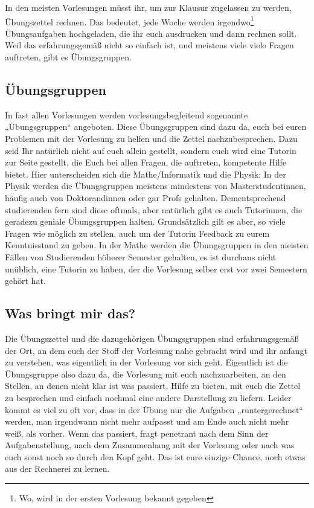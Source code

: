 \newpage{}

\noindent In den meisten Vorlesungen müsst ihr, um zur Klausur zugelassen zu werden, Übungszettel rechnen. Das bedeutet, jede Woche werden irgendwo\footnote{Wo, wird in der ersten Vorlesung bekannt gegeben} Übungsaufgaben hochgeladen, die ihr euch ausdrucken und dann rechnen sollt. Weil das erfahrungsgemäß nicht so einfach ist, und meistens viele viele Fragen auftreten, gibt es Übungsgruppen.

\subsection{Übungsgruppen}
In fast allen Vorlesungen werden vorlesungsbegleitend sogenannte „Übungsgruppen“ angeboten. Diese Übungsgruppen sind dazu da, euch bei euren Problemen mit der Vorlesung zu helfen und die Zettel nachzubesprechen. Dazu seid Ihr natürlich nicht auf euch allein gestellt, sondern euch wird eine Tutorin zur Seite gestellt, die Euch bei allen Fragen, die auftreten, kompetente Hilfe bietet. Hier unterscheiden sich die Mathe/Informatik und die Physik: In der Physik werden die Übungsgruppen meistens mindestens von Masterstudentinnen, häufig auch von Doktorandinnen oder gar Profs gehalten. Dementsprechend studierenden fern sind diese oftmals, aber natürlich gibt es auch Tutorinnen, die geradezu geniale Übungsgruppen halten. Grundsätzlich gilt es aber, so viele Fragen wie möglich zu stellen, auch um der Tutorin Feedback zu eurem Kenntnisstand zu geben. In der Mathe werden die Übungsgruppen in den meisten Fällen von Studierenden höherer Semester gehalten, es ist durchaus nicht unüblich, eine Tutorin zu haben, der die Vorlesung selber erst vor zwei Semestern gehört hat.

\subsection{Was bringt mir das?}
Die Übungszettel und die dazugehörigen Übungsgruppen sind erfahrungsgemäß der Ort, an dem euch der Stoff der Vorlesung nahe gebracht wird und ihr anfangt zu verstehen, was eigentlich in der Vorlesung vor sich geht. Eigentlich ist die Übungsgruppe also dazu da, die Vorlesung mit euch nachzuarbeiten, an den Stellen, an denen nicht klar ist was passiert, Hilfe zu bieten, mit euch die Zettel zu besprechen und einfach nochmal eine andere Darstellung zu liefern. Leider kommt es viel zu oft vor, dass in der Übung nur die Aufgaben „runtergerechnet“ werden, man irgendwann nicht mehr aufpasst und am Ende auch nicht mehr weiß, als vorher. Wenn das passiert, fragt penetrant nach dem Sinn der Aufgabenstellung, nach dem Zusammenhang mit der Vorlesung oder nach was euch sonst noch so durch den Kopf geht. Das ist eure einzige Chance, noch etwas aus der Rechnerei zu lernen.


